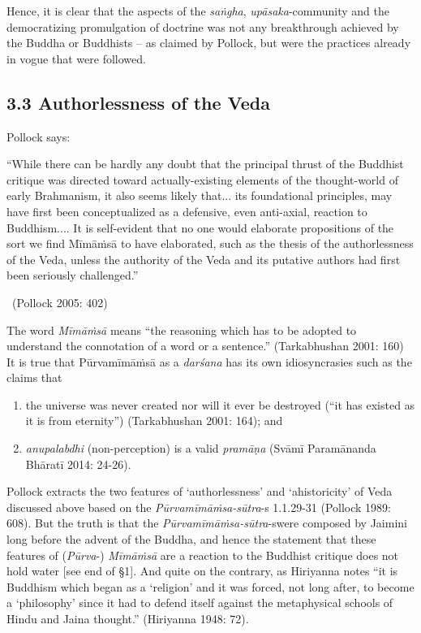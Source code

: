 Hence, it is clear that the aspects of the \textit{saṅgha}, \textit{upāsaka}-community and the democratizing promulgation of doctrine was not any breakthrough achieved by the Buddha or Buddhists – as claimed by Pollock, but were the practices already in vogue that were followed.


\subsection*{3.3 Authorlessness of the Veda}

Pollock says:

\begin{myquote}
“While there can be hardly any doubt that the principal thrust of the Buddhist critique was directed toward actually-existing elements of the thought-world of early Brahmanism, it also seems likely that... its foundational principles, may have first been conceptualized as a defensive, even anti-axial, reaction to Buddhism.... It is self-evident that no one would elaborate propositions of the sort we find Mīmāṁsā to have elaborated, such as the thesis of the authorlessness of the Veda, unless the authority of the Veda and its putative authors had first been seriously challenged.” 

~\hfill (Pollock 2005: 402)
\end{myquote}

The word \textit{Mīmāṁsā} means “the reasoning which has to be adopted to understand the connotation of a word or a sentence.” (Tarkabhushan 2001: 160) It is true that Pūrvamīmāṁsā as a \textit{darśana} has its own idiosyncrasies such as the claims that

\begin{enumerate}
\itemsep=0pt
\item the universe was never created nor will it ever be destroyed (“it has existed as it is from eternity”) (Tarkabhushan 2001: 164); and

 \item \textit{anupalabdhi} (non-perception) is a valid \textit{pramāṇa} (Svāmī Paramānanda Bhāratī 2014: 24-26).

\end{enumerate}

Pollock extracts the two features of ‘authorlessness’ and ‘ahistoricity’ of Veda discussed above based on the \textit{Pūrvamīmāṁsa-sūtra}-s 1.1.29-31 (Pollock 1989: 608). But the truth is that the \textit{Pūrvamīmāṁsa-sūtra}-s\break were composed by Jaimini long before the advent of the Buddha, and hence the statement that these features of (\textit{Pūrva}-) \textit{Mīmāṁsā }are a reaction to the Buddhist critique does not hold water [see end of §1]. And quite on the contrary, as Hiriyanna notes “it is Buddhism which began as a ‘religion’ and it was forced, not long after, to become a ‘philosophy’ since it had to defend itself against the metaphysical schools of Hindu and Jaina thought.” (Hiriyanna 1948: 72).

